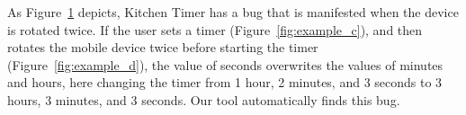 \begin{figure}[!t]
\centering
{}
\hfil
{}
\label{fig:example}
\end{figure}


As Figure~\ref{fig:example} depicts, Kitchen Timer has a bug that is manifested when the device is rotated twice. If the user sets a timer (Figure~\ref{fig:example_c}), and then rotates the mobile device twice before starting the timer (Figure~\ref{fig:example_d}), the value of seconds overwrites the values of minutes and hours, here changing the timer from 1 hour, 2 minutes, and 3 seconds to 3 hours, 3 minutes, and 3 seconds.
Our tool automatically finds this bug. %


